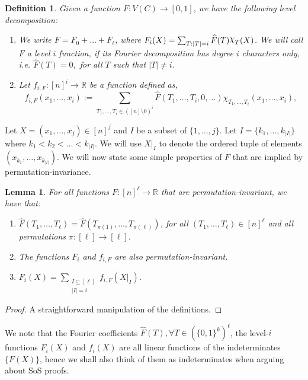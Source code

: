 \documentclass[11pt]{article}
\def \R {\mathbb{R}}
\def \C {(\{0,1\}^k)^\ell}
\def \sos {SoS\xspace}
\def \Chi {\raisebox{2pt}{$\chi$}}
\renewcommand{\hat}[1]{\widehat{#1}}
\newtheorem{lemma}[theorem]{Lemma}
\newtheorem{definition}[theorem]{Definition}
\theoremstyle{definition}
\begin{document}
\begin{definition}\label{def:f_i}
Given a function $F\colon V(C)\to [0,1]$, we have the following level decomposition:
\begin{enumerate}
\item We write 
$F = F_0 + \ldots + F_\ell$,
where $F_i(X) = \sum_{T: |T| = i} \hat{F}(T) \Chi_T(X)$. We will call $F$ a level $i$ function, if its Fourier decomposition has degree $i$ characters only, i.e. $\hat{F}(T) = 0,$ for all $T$ such that $|T| \neq i$.
\item Let $f_{i,F}: [n]^i \rightarrow \R$ be a function defined as, 
$$f_{i,F}(x_1,\ldots,x_i) := \sum_{T_1,\ldots,T_i \in ([n] \setminus 0)^i}\hat{F}(T_1,\ldots,T_i,0,\ldots)\chi_{T_1,\ldots,T_i}(x_1,\ldots,x_i),$$ 
\end{enumerate}
\end{definition}



Let $X = (x_1,\ldots,x_{j}) \in [n]^{j}$ and $I$ be a subset of $\{1,\ldots,j\}$. Let $I = \{k_1,\ldots,k_{|I|}\}$ where $k_1 < k_2 < \ldots < k_{|I|}$. We will use $X|_I$ to denote the ordered tuple of elements $(x_{k_1},\ldots,x_{k_{|I|}})$. We will now state some simple properties of $F$ that are implied by permutation-invariance.

\begin{lemma}\label{lem:props}
For all functions $F:[n]^\ell \rightarrow \R$ that are permutation-invariant, we have that:
\begin{enumerate}
\item $\hat{F}(T_1,\ldots, T_\ell) = \hat{F}(T_{\pi(1)},\ldots,T_{\pi(\ell)})$, for all $(T_1,\ldots,T_\ell) \in [n]^\ell$ and all permutations $\pi:[\ell] \rightarrow [\ell]$.

\item The functions $F_i$ and $f_{i,F}$ are also permutation-invariant.

\item $F_i(X) = \sum\limits_{\substack{I \subseteq [\ell] \\ |I| = i}} f_{i,F}(X|_{I})$.
\end{enumerate}
\end{lemma}
\begin{proof}
A straightforward manipulation of the definitions.
\end{proof}

We note that the Fourier coefficients $\hat{F}(T), \forall T \in \C$, the level-$i$ functions $F_i(X)$ and $f_i(X)$ are all linear functions of the indeterminates $\{F(X)\}$,
hence we shall also think of them as indeterminates 
when arguing about \sos proofs.
\end{document}
